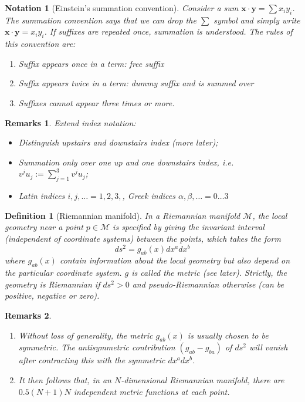\documentclass[a4paper]{article}
\newtheorem{remarks}{Remarks}[section]
\newtheorem{notation}{Notation}[section]
\theoremstyle{new}
\newtheorem{defi}{Definition}[section]
\begin{document}
\begin{notation}[Einstein's summation convention]
  Consider a sum $\mathbf{x}\cdot \mathbf{y} = \sum x_i y_i$. The summation convention says that we can drop the $\sum$ symbol and simply write $\mathbf{x}\cdot \mathbf{y} = x_i y_i$. If suffixes are repeated once, summation is understood. The rules of this convention are:
  \begin{enumerate}
    \item Suffix appears once in a term: free suffix
    \item Suffix appears twice in a term: dummy suffix and is summed over
    \item Suffixes cannot appear three times or more.
  \end{enumerate}
\end{notation}
\begin{remarks}
Extend index notation:
\begin{itemize}
    \item Distinguish upstairs and downstairs index (more later);
    \item Summation only over one up and one downstairs index, i.e. $v^ju_j:=\sum_{j=1}^3v^ju_j$;
    \item Latin indices $i,j,\dots =1,2,3,$, Greek indices $\alpha,\beta,\dots =0\dots 3$
\end{itemize}
\end{remarks}
\begin{defi}[Riemannian manifold]
In a Riemannian manifold $\mathcal{M}$, the local geometry near a point $p\in\mathcal{M}$ is specified by giving the invariant interval (independent of coordinate systems) between the points, which takes the form
$$ds^2=g_{ab}(x)dx^adx^b$$
where $g_{ab}(x)$ contain information about the local geometry but also depend on the particular coordinate system. $g$ is called the metric (see later). Strictly, the geometry is Riemannian if $ds^2>0$ and pseudo-Riemannian otherwise (can be positive, negative or zero).
\end{defi}
\begin{remarks}\leavevmode
\begin{enumerate}
    \item Without loss of generality, the metric $g_{ab}(x)$ is usually chosen to be symmetric. The antisymmetric contribution $(g_{ab}-g_{ba})$ of $ds^2$ will vanish after contracting this with the symmetric $dx^adx^b$.
    \item It then follows that, in an $N$-dimensional Riemannian manifold, there are $0.5(N+1)N$ independent metric functions at each point.
\end{enumerate}
\end{remarks}
\end{document}
